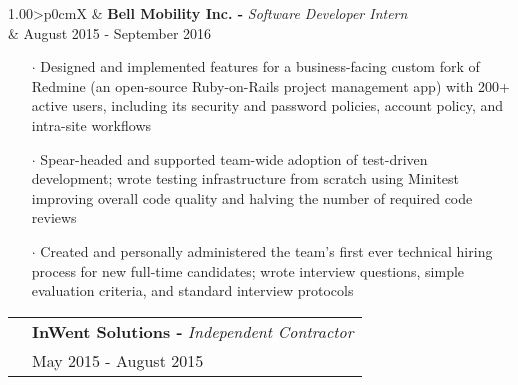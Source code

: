 \documentclass[a4paper, oneside, final]{scrartcl} %
\newcommand{\gray}{\rowcolor[gray]{.90}} %
\begin{document}
\begin{center}
  \vspace{-0.2cm}

  \begin{tabularx}{1.00\linewidth}{>{\raggedleft\scshape}p{0cm}X}
    \gray& \textbf{Bell Mobility Inc. -} \textit{Software Developer Intern}\\
    \gray& {August 2015 - September 2016}\\
  \end{tabularx}
  \vspace{-0.2cm}
  \begin{itemize}\itemsep-0.2cm
      \vspace{-0.1cm}

    \item[$\cdot$] Designed and implemented features for a business-facing custom fork of Redmine (an open-source Ruby-on-Rails project management app) with 200+ active users, including its security and password policies, account policy, and intra-site workflows\\
    \item[$\cdot$] Spear-headed and supported team-wide adoption of test-driven development; wrote testing infrastructure from scratch using Minitest improving overall code quality and halving the number of required code reviews \\
    \item[$\cdot$] Created and personally administered the team’s first ever technical hiring process for new full-time candidates; wrote interview questions, simple evaluation criteria, and standard interview protocols\\

  \end{itemize}

  \vspace{-0.2cm}

  \begin{tabularx}{1.00\linewidth}{>{\raggedleft\scshape}p{0cm}X}
    \gray& \textbf{InWent Solutions -} \textit{Independent Contractor}\\
    \gray& {May 2015 - August 2015}\\
  \end{tabularx}
  \vspace{-0.2cm}
  \begin{itemize}\itemsep-0.2cm
      \vspace{-0.1cm}


\end{itemize}
\end{center}
\end{document}
